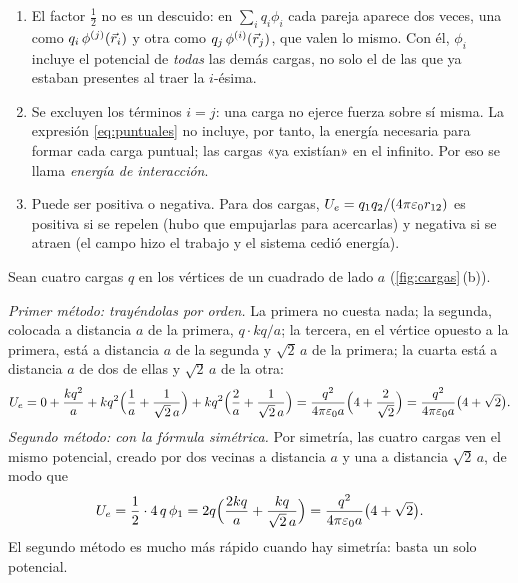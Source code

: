 \begin{observacion}\label{obs:interaccion}
\begin{enumerate}
  \item El factor $\frac12$ no es un descuido: en $\sum_iq_i\phi_i$ cada pareja aparece dos veces, una como $q_i\,\phi^{(j)}(\vec r_i)$ y otra como
        $q_j\,\phi^{(i)}(\vec r_j)$, que valen lo mismo. Con él, $\phi_i$ incluye el potencial de \emph{todas} las demás cargas, no solo el de las que ya estaban
        presentes al traer la $i$-ésima.
  \item Se excluyen los términos $i=j$: una carga no ejerce fuerza sobre sí misma. La expresión \eqref{eq:puntuales} no incluye,
        por tanto, la energía necesaria para formar cada carga puntual; las cargas «ya existían» en el infinito. Por eso se llama
        \emph{energía de interacción}.
  \item Puede ser positiva o negativa. Para dos cargas, $U_e=q_1q_2/(4\pi\varepsilon_0 r_{12})$ es positiva si se repelen (hubo que empujarlas
        para acercarlas) y negativa si se atraen (el campo hizo el trabajo y el sistema cedió energía).
\end{enumerate}
\end{observacion}

\begin{ejemplo}\label{ej:cuadrado}
Sean cuatro cargas $q$ en los vértices de un cuadrado de lado $a$ (\cref{fig:cargas}\,(b)).

\emph{Primer método: trayéndolas por orden.} La primera no cuesta nada; la segunda, colocada a distancia $a$ de la primera,
$q\cdot kq/a$; la tercera, en el vértice opuesto a la primera, está a distancia $a$ de la segunda y $\sqrt2\,a$ de la primera; la
cuarta está a distancia $a$ de dos de ellas y $\sqrt2\,a$ de la otra:
\[
  U_e=0+\frac{kq^2}{a}+kq^2\Big(\frac1a+\frac{1}{\sqrt2\,a}\Big)+kq^2\Big(\frac2a+\frac{1}{\sqrt2\,a}\Big)
     =\frac{q^2}{4\pi\varepsilon_0 a}\Big(4+\frac{2}{\sqrt2}\Big)=\frac{q^2}{4\pi\varepsilon_0 a}\big(4+\sqrt2\big).
\]
\emph{Segundo método: con la fórmula simétrica.} Por simetría, las cuatro cargas ven el mismo potencial, creado por dos vecinas a
distancia $a$ y una a distancia $\sqrt2\,a$, de modo que
\[
  U_e=\frac12\cdot4\,q\,\phi_1=2q\Big(\frac{2kq}{a}+\frac{kq}{\sqrt2\,a}\Big)=\frac{q^2}{4\pi\varepsilon_0 a}\big(4+\sqrt2\big).
\]
El segundo método es mucho más rápido cuando hay simetría: basta un solo potencial.
\end{ejemplo}
